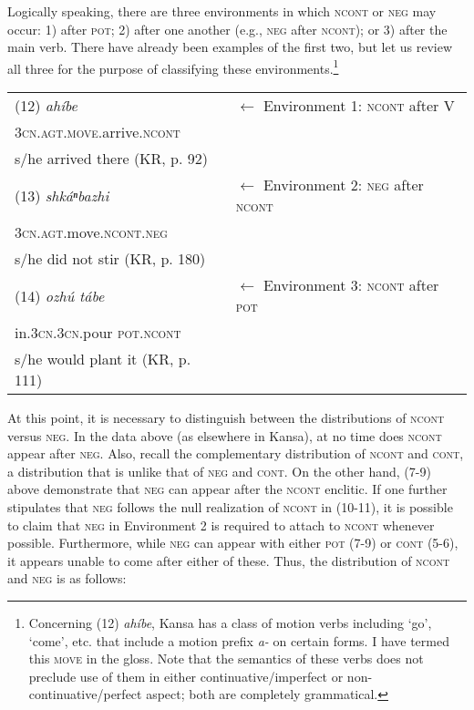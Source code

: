 \documentclass[output=paper]{LSP/langsci}
\begin{document}
Logically speaking, there are three environments in which \textsc{ncont} or \textsc{neg} may occur: 1) after \textsc{pot}; 2) after one another (e.g., \textsc{neg} after \textsc{ncont}); or 3) after the main verb. There have already been examples of the first two, but let us review all three for the purpose of classifying these environments.\footnote{Concerning (12) \textit{ah\'ibe}, Kansa has a class of motion verbs including `go', `come', etc. that include a motion prefix \textit{a-} on certain forms. I have termed this \textsc{move} in the gloss. Note that the semantics of these verbs does not preclude use of them in either continuative/imperfect or non-continuative/perfect aspect; both are completely grammatical.}

\vspace{1em}
\begin{tabular}{ l l }
(12)	\textit{ah\'ibe} & $\leftarrow$ Environment 1: \textsc{ncont} after V \\
\hspace{2em} \textsc{3cn.agt.move}.arrive.\textsc{ncont} & \\
\hspace{2em} s/he arrived there (KR, p. 92) & \\
(13)	\textit{shk\'aⁿbazhi}	& $\leftarrow$ Environment 2: \textsc{neg} after \textsc{ncont} \\
\hspace{2em} \textsc{3cn.agt}.move.\textsc{ncont.neg} & \\
\hspace{2em} s/he did not stir (KR, p. 180) & \\
(14) \textit{ozh\'u	t\'abe	} & $\leftarrow$ Environment 3: \textsc{ncont} after \textsc{pot} \\
\hspace{2em} in.\textsc{3cn.3cn}.pour \textsc{pot.ncont} & \\
\hspace{2em} s/he would plant it (KR, p. 111) & \\
\end{tabular}

\vspace{1em}
At this point, it is necessary to distinguish between the distributions of \textsc{ncont} versus \textsc{neg}. In the data above (as elsewhere in Kansa), at no time does \textsc{ncont} appear after \textsc{neg}. Also, recall the complementary distribution of \textsc{ncont} and \textsc{cont}, a distribution that is unlike that of \textsc{neg} and \textsc{cont}. On the other hand, (7-9) above demonstrate that \textsc{neg} can appear after the \textsc{ncont} enclitic. If one further stipulates that \textsc{neg} follows the null realization of \textsc{ncont} in (10-11), it is possible to claim that \textsc{neg} in Environment 2 is required to attach to \textsc{ncont} whenever possible. Furthermore, while \textsc{neg} can appear with either \textsc{pot} (7-9) or \textsc{cont} (5-6), it appears unable to come after either of these. Thus, the distribution of \textsc{ncont} and \textsc{neg} is as follows:
\end{document}
